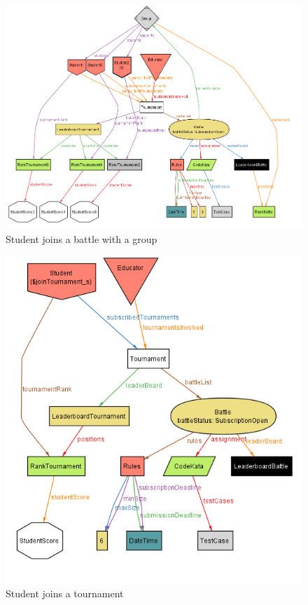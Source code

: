 \begin{figure}[!]
    \centering        
            \includegraphics[width=1.3\linewidth]{misc//Images//AlloySims/joinNewBattle.png}
            \caption{Student joins a battle with a group}    
    
\end{figure}


\begin{figure}
    \centering
    \includegraphics[width=1\linewidth]{misc//Images//AlloySims/joinTournament.png}
    \caption{Student joins a tournament}
    \label{fig:enter-label}
\end{figure}


